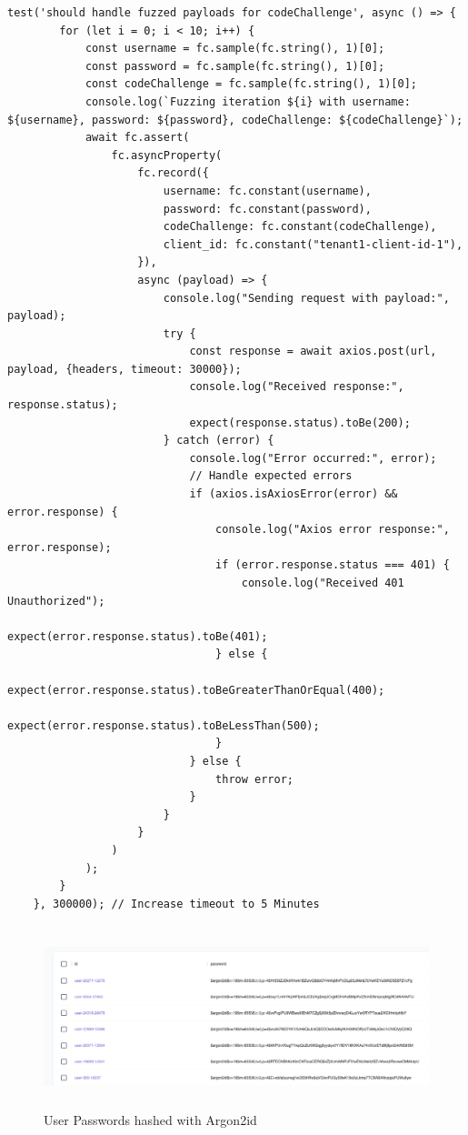\begin{lstlisting}[style=typescript,caption=Fuzz Test,label=apendix:fuzz_test]
    test('should handle fuzzed payloads for codeChallenge', async () => {
        for (let i = 0; i < 10; i++) {
            const username = fc.sample(fc.string(), 1)[0];
            const password = fc.sample(fc.string(), 1)[0];
            const codeChallenge = fc.sample(fc.string(), 1)[0];
            console.log(`Fuzzing iteration ${i} with username: ${username}, password: ${password}, codeChallenge: ${codeChallenge}`);
            await fc.assert(
                fc.asyncProperty(
                    fc.record({
                        username: fc.constant(username),
                        password: fc.constant(password),
                        codeChallenge: fc.constant(codeChallenge),
                        client_id: fc.constant("tenant1-client-id-1"),
                    }),
                    async (payload) => {
                        console.log("Sending request with payload:", payload);
                        try {
                            const response = await axios.post(url, payload, {headers, timeout: 30000});
                            console.log("Received response:", response.status);
                            expect(response.status).toBe(200);
                        } catch (error) {
                            console.log("Error occurred:", error);
                            // Handle expected errors
                            if (axios.isAxiosError(error) && error.response) {
                                console.log("Axios error response:", error.response);
                                if (error.response.status === 401) {
                                    console.log("Received 401 Unauthorized");
                                    expect(error.response.status).toBe(401);
                                } else {
                                    expect(error.response.status).toBeGreaterThanOrEqual(400);
                                    expect(error.response.status).toBeLessThan(500);
                                }
                            } else {
                                throw error;
                            }
                        }
                    }
                )
            );
        }
    }, 300000); // Increase timeout to 5 Minutes
\end{lstlisting}
\begin{figure}[h!]
\label{fig:argon2id_hash}
\centering
\includegraphics[width=\textwidth, height=200px]{pics/argon2id.png}
\caption{User Passwords hashed with Argon2id}
\end{figure}

